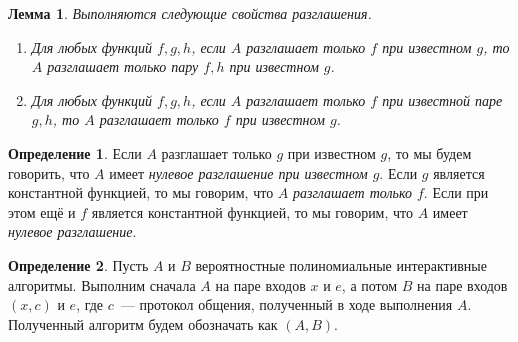 \documentclass[12pt,a4paper]{article}
\theoremstyle{definition}
\newtheorem{definition}{Определение}[section]
\theoremstyle{plain}
\newtheorem{lemma}{Лемма}[section]
\theoremstyle{remark}
\begin{document}
\begin{lemma}
Выполняются следующие свойства разглашения.
\begin{enumerate}
\item Для любых функций $f,g,h$, если $A$ разглашает только $f$ при известном $g$,
то $A$ разглашает только пару $f,h$ при известном $g$.

\item Для любых функций $f,g,h$, если $A$ разглашает только $f$ при известной паре $g,h$,
то $A$ разглашает только $f$ при известном $g$.
\end{enumerate}
\end{lemma}

\begin{definition}
Если $A$ разглашает только $g$ при известном $g$, то мы будем говорить,
что $A$ имеет \emph{нулевое разглашение при известном $g$}. Если $g$
является константной функцией, то мы говорим, что $A$ \emph{разглашает только $f$}.
Если при этом ещё и $f$ является константной функцией, то мы говорим, что $A$ имеет
\emph{нулевое разглашение}.
\end{definition}

\begin{definition}
Пусть $A$ и $B$ вероятностные полиномиальные интерактивные алгоритмы. Выполним сначала $A$ на паре входов
$x$ и $e$, а потом $B$ на паре входов $(x,c)$ и $e$, где $c$~--- протокол общения,
полученный в ходе выполнения $A$. Полученный алгоритм будем обозначать как $(A,B)$.
\end{definition}
\end{document}
